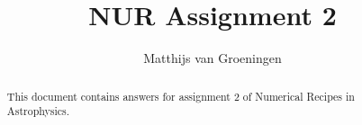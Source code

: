 \documentclass[a4paper,10pt]{article}
\title{NUR Assignment 2}
\author{Matthijs van Groeningen}
\begin{document}
\maketitle

\begin{abstract}
This document contains answers for assignment 2 of Numerical Recipes in Astrophysics. 
\end{abstract}

\newpage



\newpage



 

\end{document}
